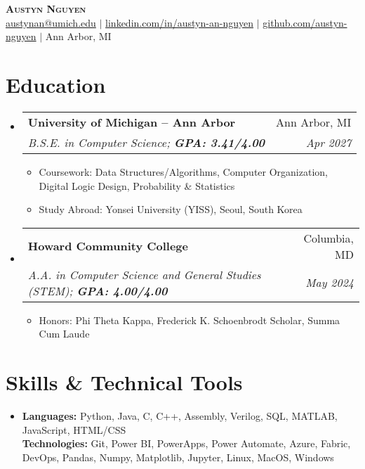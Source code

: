 \documentclass[letterpaper,11pt]{article}
\makeatletter
\newcommand{\resumeItem}[1]{\item[\textopenbullet]\small{#1 \vspace{-2pt}}}
\newcommand{\resumeSubheading}[4]{
  \vspace{-2pt}\item
  \begin{tabular*}{0.97\textwidth}[t]{l@{\extracolsep{\fill}}r}
    \textbf{#1} & #2 \\
    \textit{\small#3} & \textit{\small #4} \\
  \end{tabular*}\vspace{-7pt}
}
\newcommand{\resumeSubHeadingListStart}{\begin{itemize}[leftmargin=0.15in, label={}]}
\newcommand{\resumeSubHeadingListEnd}{\end{itemize}}
\newcommand{\resumeItemListStart}{\begin{itemize}[leftmargin=0.2in, label=\textopenbullet]}
\newcommand{\resumeItemListEnd}{\end{itemize}\vspace{-5pt}}
\makeatother
\begin{document}
\begin{center}
  \textbf{\Huge \scshape Austyn Nguyen} \\ \vspace{3pt}
  \small
  \faEnvelope \hspace{.5pt} \href{mailto:austynan@umich.edu}{austynan@umich.edu}
  $|$
  \faLinkedinSquare \hspace{.5pt} \href{https://www.linkedin.com/in/austyn-an-nguyen}{linkedin.com/in/austyn-an-nguyen}
  $|$
  \faGithub \hspace{.5pt} \href{https://github.com/austyn-nguyen}{github.com/austyn-nguyen}
  $|$
  \faMapMarker \hspace{.5pt} Ann Arbor, MI
\end{center}

\section{Education}
\resumeSubHeadingListStart
  \resumeSubheading
    {University of Michigan -- Ann Arbor}{Ann Arbor, MI}
    {B.S.E. in Computer Science; \textbf{GPA: 3.41/4.00}}{Apr 2027}
    \resumeItemListStart
      \resumeItem{Coursework: Data Structures/Algorithms, Computer Organization, Digital Logic Design, Probability \& Statistics}
      \resumeItem{Study Abroad: Yonsei University (YISS), Seoul, South Korea}
    \resumeItemListEnd

  \resumeSubheading
    {Howard Community College}{Columbia, MD}
    {A.A. in Computer Science and General Studies (STEM); \textbf{GPA: 4.00/4.00}}{May 2024}
    \resumeItemListStart
        \resumeItem{Honors: Phi Theta Kappa, Frederick K. Schoenbrodt Scholar, Summa Cum Laude}
    \resumeItemListEnd
\resumeSubHeadingListEnd

\section{Skills \& Technical Tools}
\resumeSubHeadingListStart
  \item{
    \textbf{Languages:} Python, Java, C, C++, Assembly, Verilog, SQL, MATLAB, JavaScript, HTML/CSS \\
    \textbf{Technologies:} Git, Power BI, PowerApps, Power Automate, Azure, Fabric, DevOps, Pandas, Numpy, Matplotlib, Jupyter, Linux, MacOS, Windows
  }
\resumeSubHeadingListEnd

\end{document}
